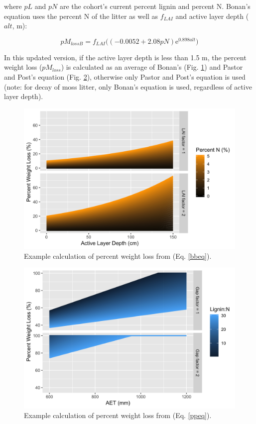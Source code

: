 \documentclass[a4paper, 12pt] {report}
\begin{document}
where $pL$ and $pN$ are the cohort's current percent lignin and percent N. Bonan's equation uses the percent N of the litter as well as $f_{LAI}$ and active layer depth ($alt$, m):

\begin{equation} \label{bbeq}
pM_{lossB} = f_{LAI}\Big((-0.0052 + 2.08pN)\text{e}^{0.898alt}\Big)
\end{equation}

In this updated version, if the active layer depth is less than 1.5 m, the percent weight loss ($pM_{loss}$) is calculated as an average of Bonan's (Fig. \ref{fig:bon}) and Pastor and Post's equation (Fig. \ref{fig:pp}), otherwise only Pastor and Post's equation is used (note: for decay of moss litter, only Bonan's equation is used, regardless of active layer depth).

\begin{figure}
  \includegraphics[width=0.8\linewidth]{Figures/Bonan.png}
  \caption{Example calculation of percent weight loss from \protect{} (Eq. \ref{bbeq}).}
  \label{fig:bon}
\end{figure}

\begin{figure}
  \includegraphics[width=0.8\linewidth]{Figures/PP.png}
  \caption{Example calculation of percent weight loss from \protect{} (Eq. \ref{ppeq}).}
  \label{fig:pp}
\end{figure}
\end{document}
